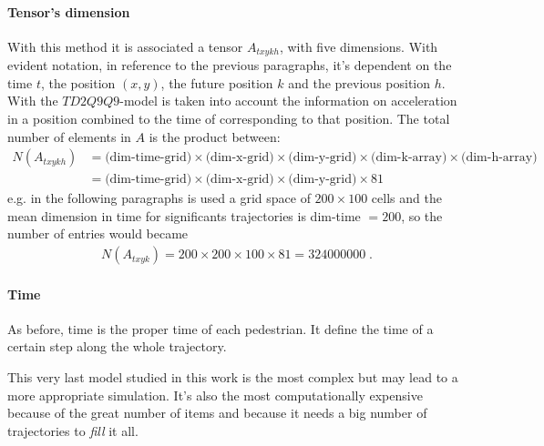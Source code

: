 \documentclass[class=article, crop=false]{standalone}
\begin{document}
\paragraph{Tensor's dimension}
With this method it is associated a tensor $A_{t x y k h}$, with five dimensions.
With evident notation, in reference to the previous paragraphs, it's dependent on the time $t$, the position $(x, y)$, the future position $k$ and the previous position $h$.
With the $TD2Q9Q9$-model is taken into account the information on acceleration in a position combined to the time of corresponding to that position.
The total number of elements in $A$ is the product between:
\begin{equation*}
\begin{split}
N(A_{t xykh}) &= \mbox{(dim-time-grid)} \times \mbox{(dim-x-grid)} \times \mbox{(dim-y-grid)} \times \mbox{(dim-k-array)} \times \mbox{(dim-h-array)} \\
& = \mbox{(dim-time-grid)} \times \mbox{(dim-x-grid)} \times \mbox{(dim-y-grid)} \times 81
\end{split}
\end{equation*}
e.g. in the following paragraphs is used a grid space of $200\times100$ cells and the mean dimension in time for significants trajectories is dim-time $ = 200$, so the number of entries would became 
\begin{equation*}
\begin{split}
N(A_{t xyk})=200 \times 200\times100\times 81 = 324000000 \; .
\end{split}
\end{equation*}

\paragraph{Time}
As before, time is the proper time of each pedestrian.
It define the time of a certain step along the whole trajectory.

This very last model studied in this work is the most complex but may lead to a more appropriate simulation.
It's also the most computationally expensive because of the great number of items and because it needs a big number of trajectories to \emph{fill} it all.
\end{document}
